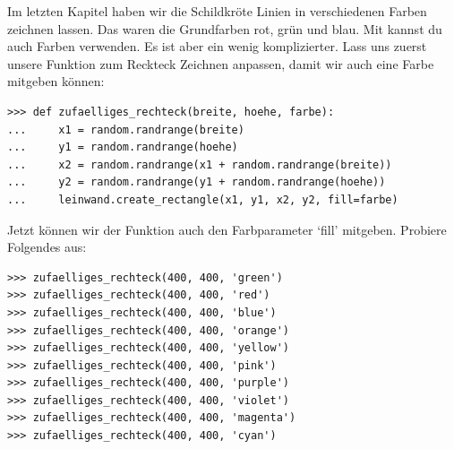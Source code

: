 Im letzten Kapitel haben wir die Schildkröte Linien in verschiedenen Farben zeichnen lassen. Das waren die Grundfarben rot, grün und blau. Mit  kannst du auch Farben verwenden. Es ist aber ein wenig komplizierter. Lass uns zuerst unsere Funktion zum Reckteck Zeichnen anpassen, damit wir auch eine Farbe mitgeben können:

\begin{Verbatim}[frame=single]
>>> def zufaelliges_rechteck(breite, hoehe, farbe):
...     x1 = random.randrange(breite)
...     y1 = random.randrange(hoehe)
...     x2 = random.randrange(x1 + random.randrange(breite))
...     y2 = random.randrange(y1 + random.randrange(hoehe))
...     leinwand.create_rectangle(x1, y1, x2, y2, fill=farbe)
\end{Verbatim}

Jetzt können wir der  Funktion auch den Farbparameter `fill' mitgeben. Probiere Folgendes aus:

\begin{Verbatim}[frame=single]
>>> zufaelliges_rechteck(400, 400, 'green')
>>> zufaelliges_rechteck(400, 400, 'red')
>>> zufaelliges_rechteck(400, 400, 'blue')
>>> zufaelliges_rechteck(400, 400, 'orange')
>>> zufaelliges_rechteck(400, 400, 'yellow')
>>> zufaelliges_rechteck(400, 400, 'pink')
>>> zufaelliges_rechteck(400, 400, 'purple')
>>> zufaelliges_rechteck(400, 400, 'violet')
>>> zufaelliges_rechteck(400, 400, 'magenta')
>>> zufaelliges_rechteck(400, 400, 'cyan')
\end{Verbatim}

